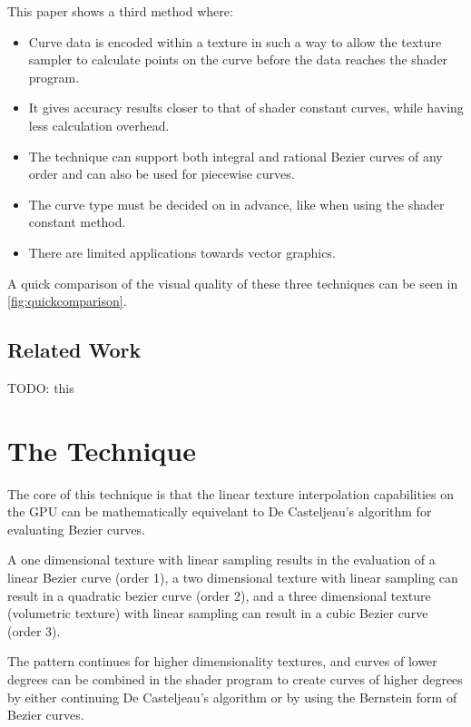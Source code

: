 \documentclass{jcgt}
\begin{document}
This paper shows a third method where:
\begin{itemize}
  \item Curve data is encoded within a texture in such a way to allow the texture sampler to calculate points on the curve before the data reaches the shader program.
  \item It gives accuracy results closer to that of shader constant curves, while having less calculation overhead.
  \item The technique can support both integral and rational Bezier curves of any order and can also be used for piecewise curves.
  \item The curve type must be decided on in advance, like when using the shader constant method.
  \item There are limited applications towards vector graphics.
\end{itemize}

A quick comparison of the visual quality of these three techniques can be seen in \autoref{fig:quickcomparison}.

\subsection{Related Work}

TODO: this

\section{The Technique}
\label{sec:thetechnique}

The core of this technique is that the linear texture interpolation capabilities on the GPU can be mathematically equivelant to De Casteljeau's algorithm for evaluating Bezier curves.

A one dimensional texture with linear sampling results in the evaluation of a linear Bezier curve (order 1), a two dimensional texture with linear sampling can result in a quadratic bezier curve (order 2), and a three dimensional texture (volumetric texture) with linear sampling can result in a cubic Bezier curve (order 3).

The pattern continues for higher dimensionality textures, and curves of lower degrees can be combined in the shader program to create curves of higher degrees by either continuing De Casteljeau's algorithm or by using the Bernstein form of Bezier curves.
\end{document}
